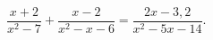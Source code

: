 \begin{ex}[type=equation]
	\begin{condition}
		$\dfrac{x + 2}{x^2 - 7} + \dfrac{x - 2}{x^2 - x - 6} = \dfrac{2x -3,2}{x^2 - 5x -14}.$
	\end{condition}
\end{ex}